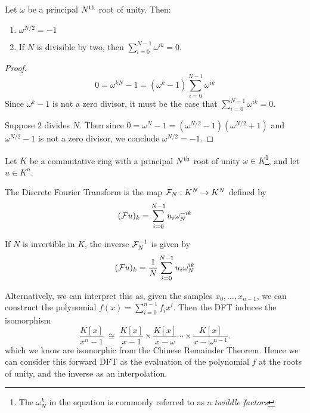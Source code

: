 \begin{lemma}\label{lem:rou-results}
    Let $\omega$ be a principal $N^{\textrm{th}}$ root of unity. Then:
    \begin{enumerate}
        \item $\omega^{N/2} = -1$
        \item If $N$ is divisible by two, then $\sum_{i = 0}^{N-1} \omega^{ik} = 0$.
    \end{enumerate}
\end{lemma}
\begin{proof}
    \[
        0 = \omega^{kN} - 1 = (\omega^k - 1)\sum^{N-1}_{i=0} \omega^{ik}
    \]
    Since $\omega^k - 1$ is not a zero divisor, it must be the case that $\sum^{N-1}_{i=0} \omega^{ik} = 0$.

    Suppose $2$ divides $N$. Then since $0 = \omega^N - 1 = (\omega^{N/2} - 1)(\omega^{N/2} + 1)$ and $\omega^{N/2} - 1$ is not a zero divisor, we conclude $\omega^{N/2} = -1$.
\end{proof}


\begin{definition}
    Let $K$ be a commutative ring with a principal $N^{\textrm{th}}$ root of unity $\omega \in K$\footnote{The $\omega_N^k$ in the equation is commonly referred to as a \textit{twiddle factors}}, and let $u \in K^n$.

    The Discrete Fourier Transform is the map $\mathcal F_N : K^N \to K^N$ defined by
    \begin{equation}\label{eq:forward-dft}
        (\mathcal Fu)_k = \sum^{N-1}_{i=0}u_i\omega_{N}^{-ik}
    \end{equation}

    If $N$ is invertible in $K$, the inverse $\mathcal F_N^{-1}$ is given by
    \begin{equation}\label{eq:reverse-dft}
        (\mathcal Fu)_k = \frac{1}{N}\sum^{N-1}_{i=0}u_i\omega_N^{ik}
    \end{equation}
\end{definition}

Alternatively, we can interpret this as, given the samples $x_0, \ldots, x_{n-1}$, we can construct the polynomial $f(x) = \sum_{i=0}^{n-1} f_i x^i$. Then the DFT induces the isomorphism
\begin{equation}\label{eq:fft-iso}
    \frac{K[x]}{x^n - 1} \; \cong \; \frac{K[x]}{x - 1} \times \frac{K[x]}{x - \omega} \cdots \times \frac{K[x]}{x - \omega^{n-1}}.
\end{equation}
which we know are isomorphic from the Chinese Remainder Theorem.
Hence we can consider this forward DFT as the evaluation of the polynomial $f$ at the roots of unity, and the inverse as an interpolation.

